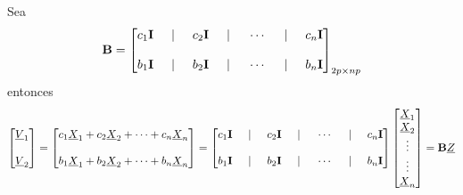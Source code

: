 \documentclass[
]{book}
\theoremstyle{definition}
\theoremstyle{definition}
\theoremstyle{definition}
\theoremstyle{definition}
\theoremstyle{remark}
\begin{document}
Sea
\[
\mathbf{B}=\begin{bmatrix}
 c_1\mathbf{I} \hspace{0.5cm}| \hspace{0.5cm} c_2\mathbf{I}  \hspace{0.5cm}| \hspace{0.5cm} \cdots  \hspace{0.5cm}| \hspace{0.5cm} c_n\mathbf{I} \\ \\ 
  b_1\mathbf{I} \hspace{0.5cm}| \hspace{0.5cm} b_2\mathbf{I}  \hspace{0.5cm}| \hspace{0.5cm} \cdots  \hspace{0.5cm}| \hspace{0.5cm} b_n\mathbf{I}
\end{bmatrix}_{2p \times np} 
\]
entonces
\[
\begin{bmatrix}
\underline{V}_1 \\ \\ \underline{V}_2
\end{bmatrix}= \begin{bmatrix}
c_1\underline{X}_1+c_2\underline{X}_2+\cdots+c_n \underline{X}_n \\ \\
b_1\underline{X}_1+b_2\underline{X}_2+\cdots+b_n \underline{X}_n
\end{bmatrix}=\begin{bmatrix}
 c_1\mathbf{I} \hspace{0.5cm}| \hspace{0.5cm} c_2\mathbf{I}  \hspace{0.5cm}| \hspace{0.5cm} \cdots  \hspace{0.5cm}| \hspace{0.5cm} c_n\mathbf{I} \\ \\ 
  b_1\mathbf{I} \hspace{0.5cm}| \hspace{0.5cm} b_2\mathbf{I}  \hspace{0.5cm}| \hspace{0.5cm} \cdots  \hspace{0.5cm}| \hspace{0.5cm} b_n\mathbf{I}
\end{bmatrix}\begin{bmatrix}
\underline{X}_1 \\ \underline{X}_2 \\ \vdots \\ \vdots \\ \underline{X}_n
\end{bmatrix}=\mathbf{B}\underline{Z}
\]
\end{document}
